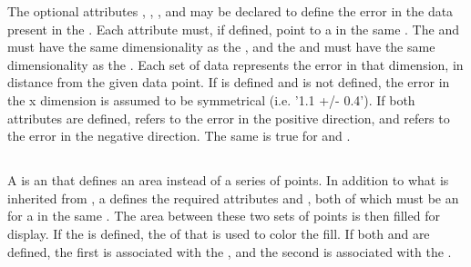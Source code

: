 \begin{blockChanged}
The optional attributes , , , and  may be declared to define the error in the data present in the \Curve.  Each attribute must, if defined, point to a \DataGenerator in the same \SedDocument.  The  and  must have the same dimensionality as the , and the  and  must have the same dimensionality as the .  Each set of data represents the error in that dimension, in distance from the given data point.  If  is defined and  is not defined, the error in the x dimension is assumed to be symmetrical (i.e. '1.1 +/- 0.4').  If both attributes are defined,  refers to the error in the positive direction, and  refers to the error in the negative direction.  The same is true for  and .


\subsection{}
\label{class:shadedArea}
A \ShadedArea is an \AbstractCurve that defines an area instead of a series of points.  In addition to what is inherited from \AbstractCurve, a \ShadedArea defines the required attributes  and , both of which must be an  for a \DataGenerator in the same \SedDocument.  The area between these two sets of points is then filled for display.  If the  is defined, the \Fill of that \Style is used to color the fill.  If both  and  are defined, the first is associated with the , and the second is associated with the .

\end{blockChanged}



